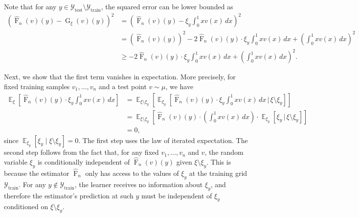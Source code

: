 \documentclass[11pt]{article}
\theoremstyle{plain}
\DeclareMathOperator*{\expect}{\mathbb{E}}
\begin{document}
Note that for any $ y \in \mathcal{Y}_{\text{test}} \setminus \mathcal{Y}_{\text{train}} $, the squared error can be lower bounded as 
\begin{equation*}
\begin{split}
\left( \widehat{\operatorname{F}}_n(v)(y) - \operatorname{G}_{\xi}(v)(y) \right)^2 
&= \left( \widehat{\operatorname{F}}_n(v)(y) - \xi_y \int_0^1 x v(x) \, dx \right)^2 \\
&= \left( \widehat{\operatorname{F}}_n(v)(y) \right)^2 
- 2 \widehat{\operatorname{F}}_n(v)(y) \cdot \xi_y \int_0^1 x v(x) \, dx 
+ \left( \int_0^1 x v(x) \, dx \right)^2 \\
&\geq -2 \widehat{\operatorname{F}}_n(v)(y) \cdot \xi_y \int_0^1 x v(x) \, dx 
+ \left( \int_0^1 x v(x) \, dx \right)^2.
\end{split}
\end{equation*}


Next, we show that the first term vanishes in expectation. More precisely, for fixed training samples $ v_1, \ldots, v_n $ and a test point $ v \sim \mu $, we have
\begin{equation*}
\begin{split}
\expect_{\xi} \left[ \widehat{\operatorname{F}}_n(v)(y) \cdot \xi_y \int_0^1 x v(x)\, dx \right]
&= \expect_{\xi \setminus \xi_y} \left[ \expect_{\xi_y} \left[ \widehat{\operatorname{F}}_n(v)(y) \cdot \xi_y \int_0^1 x v(x)\, dx \,\bigg|\, \xi \setminus \xi_y \right] \right] \\
&= \expect_{\xi \setminus \xi_y} \left[ \widehat{\operatorname{F}}_n(v)(y) \cdot \left( \int_0^1 x v(x)\, dx \right) \cdot \expect_{\xi_y} \left[ \xi_y \,\big|\, \xi \setminus \xi_y \right] \right] \\
&= 0,
\end{split}
\end{equation*}
since $ \expect_{\xi_y} [\xi_y \mid \xi \setminus \xi_y] = 0 $. The first step uses the law of iterated expectation. The second step follows from the fact that, for any fixed $ v_1, \ldots, v_n $ and $ v $, the random variable $ \xi_y $ is conditionally independent of $ \widehat{\operatorname{F}}_n(v)(y) $ given $ \xi \setminus \xi_y $. This is because the estimator $ \widehat{\operatorname{F}}_n $ only has access to the values of $ \xi_y $ at the training grid $ \mathcal{Y}_{\text{train}} $. For any $ y \notin \mathcal{Y}_{\text{train}} $, the learner receives no information about $ \xi_y $, and therefore the estimator’s prediction at such $ y $ must be independent of $ \xi_y $ conditioned on $ \xi \setminus \xi_y $.
\end{document}
